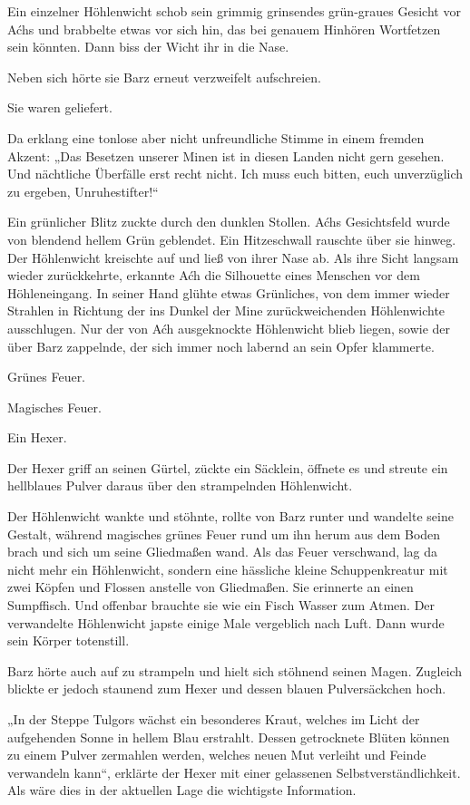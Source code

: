 Ein einzelner Höhlenwicht schob sein grimmig grinsendes grün-graues Gesicht vor Aćhs und brabbelte etwas vor sich hin, das bei genauem Hinhören Wortfetzen sein könnten. Dann biss der Wicht ihr in die Nase.

Neben sich hörte sie Barz erneut verzweifelt aufschreien.

Sie waren geliefert.

Da erklang eine tonlose aber nicht unfreundliche Stimme in einem fremden Akzent: „Das Besetzen unserer Minen ist in diesen Landen nicht gern gesehen. Und nächtliche Überfälle erst recht nicht. Ich muss euch bitten, euch unverzüglich zu ergeben, Unruhestifter!“

Ein grünlicher Blitz zuckte durch den dunklen Stollen. Aćhs Gesichtsfeld wurde von blendend hellem Grün geblendet. Ein Hitzeschwall rauschte über sie hinweg. Der Höhlenwicht kreischte auf und ließ von ihrer Nase ab. Als ihre Sicht langsam wieder zurückkehrte, erkannte Aćh die Silhouette eines Menschen vor dem Höhleneingang. In seiner Hand glühte etwas Grünliches, von dem immer wieder Strahlen in Richtung der ins Dunkel der Mine zurückweichenden Höhlenwichte ausschlugen. Nur der von Aćh ausgeknockte Höhlenwicht blieb liegen, sowie der über Barz zappelnde, der sich immer noch labernd an sein Opfer klammerte.

Grünes Feuer.

Magisches Feuer.

Ein Hexer.

Der Hexer griff an seinen Gürtel, zückte ein Säcklein, öffnete es und streute ein hellblaues Pulver daraus über den strampelnden Höhlenwicht.

Der Höhlenwicht wankte und stöhnte, rollte von Barz runter und wandelte seine Gestalt, während magisches grünes Feuer rund um ihn herum aus dem Boden brach und sich um seine Gliedmaßen wand. Als das Feuer verschwand, lag da nicht mehr ein Höhlenwicht, sondern eine hässliche kleine Schuppenkreatur mit zwei Köpfen und Flossen anstelle von Gliedmaßen. Sie erinnerte an einen Sumpffisch. Und offenbar brauchte sie wie ein Fisch Wasser zum Atmen. Der verwandelte Höhlenwicht japste einige Male vergeblich nach Luft. Dann wurde sein Körper totenstill.

Barz hörte auch auf zu strampeln und hielt sich stöhnend seinen Magen. Zugleich blickte er jedoch staunend zum Hexer und dessen blauen Pulversäckchen hoch.

„In der Steppe Tulgors wächst ein besonderes Kraut, welches im Licht der aufgehenden Sonne in hellem Blau erstrahlt. Dessen getrocknete Blüten können zu einem Pulver zermahlen werden, welches neuen Mut verleiht und Feinde verwandeln kann“, erklärte der Hexer mit einer gelassenen Selbstverständlichkeit. Als wäre dies in der aktuellen Lage die wichtigste Information.

